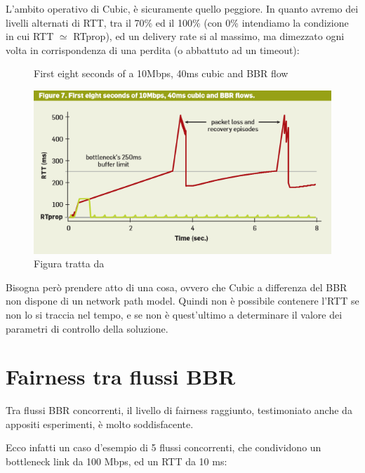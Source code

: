 L'ambito operativo di Cubic, è sicuramente quello peggiore. In quanto avremo dei livelli alternati di RTT, tra il 70\% ed il 100\% (con 0\% intendiamo la condizione in cui RTT $ \simeq $ RTprop), ed un delivery rate si al massimo, ma dimezzato ogni volta in corrispondenza di una perdita (o abbattuto ad un timeout):

\begin{figure}[H]

\center
\caption{First eight seconds of a 10Mbps, 40ms cubic and BBR flow}
\includegraphics[scale=1.1]{chapters/application/img/rtt_cubic_bbr}
\caption*{Figura tratta da \cite[p.~64]{Cardwell:2017:BCC:3042068.3009824}}

\end{figure}

Bisogna però prendere atto di una cosa, ovvero che Cubic a differenza del BBR non dispone di un network path model. Quindi non è possibile contenere l'RTT se non lo si traccia nel tempo, e se non è quest'ultimo a determinare il valore dei parametri di controllo della soluzione.

\section{Fairness tra flussi BBR}

Tra flussi BBR concorrenti, il livello di fairness raggiunto, testimoniato anche da appositi esperimenti, è molto soddisfacente. \bigskip

Ecco infatti un caso d'esempio di 5 flussi concorrenti, che condividono un bottleneck link da 100 Mbps, ed un RTT da 10 ms:

